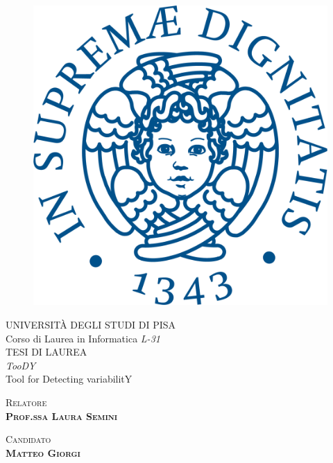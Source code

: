 \documentclass[12pt]{report}
\newcommand{\toody}{\textsl{TooDY}\xspace}
\begin{document}
\fontsize{13}{18}\selectfont




\begin{titlepage}
\begin{figure}
\centering\includegraphics[scale=0.5]{cherubino.png}
\vspace{0.5cm}
\end{figure}
\begin{center}
{\large{UNIVERSITÀ DEGLI STUDI DI PISA}}\\
\vspace{0.5cm}
{\LARGE{Corso di Laurea in Informatica \textsl{L-31}}}\\
\vspace{2cm}
{\Large{TESI DI LAUREA}}\\
\vspace{2cm}
{\huge{\toody\\{\normalsize Tool for Detecting variabilitY}}}
\end{center}
\vspace{2cm}
\begin{minipage}[t]{0.49\textwidth}\centering
{\large{\scshape{Relatore}\\\bf{Prof.ssa Laura Semini}}}
\end{minipage}
\hfill
\begin{minipage}[t]{0.49\textwidth}\centering
{\large{\scshape{Candidato}\\\bf{Matteo Giorgi}}}
\vspace{4cm}
\end{minipage}
\end{titlepage}
\end{document}
